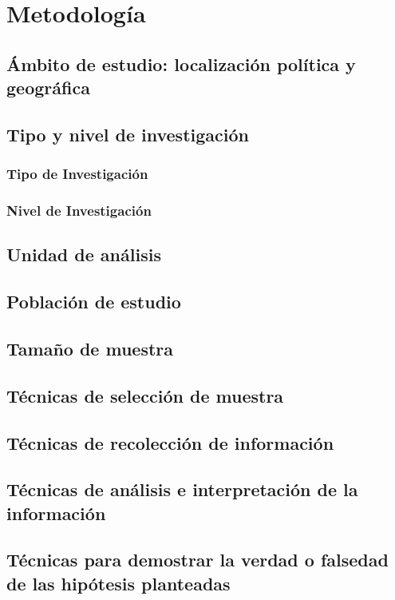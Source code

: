 	\chapter{Metodología}

		\section{Ámbito de estudio: localización política y geográfica}
		
		
		\section{Tipo y nivel de investigación}
			\subsection{Tipo de Investigación}
			
				
			\subsection{Nivel de Investigación}
				
				
		\section{Unidad de análisis}
			
		\section{Población de estudio}	
		
		\section{Tamaño de muestra}				
						
		\section{Técnicas de selección de muestra}
		
		\section{Técnicas de recolección de información}	
		
		\section{Técnicas de análisis e interpretación de la información}
		
		\section{Técnicas para demostrar la verdad o falsedad de las hipótesis planteadas}
		
		